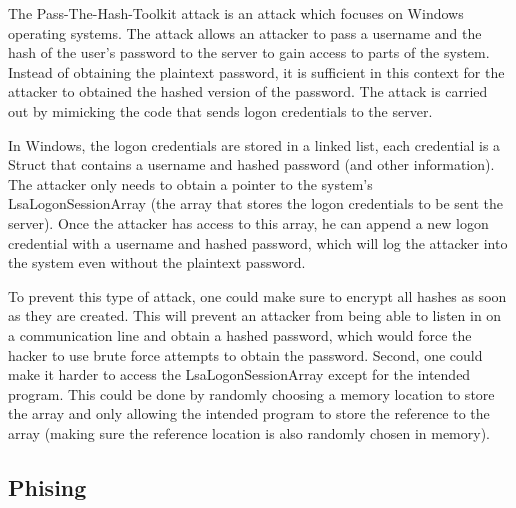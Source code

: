 \documentclass[psamsfonts]{amsart}
\begin{document}
The Pass-The-Hash-Toolkit attack is an attack which focuses on Windows operating systems. The attack allows an attacker to pass a username and the hash of the user's password to the server to gain access to parts of the system. Instead of obtaining the plaintext password, it is sufficient in this context for the attacker to obtained the hashed version of the password. The attack is carried out by mimicking the code that sends logon credentials to the server.

In Windows, the logon credentials are stored in a linked list, each credential is a Struct that contains a username and hashed password (and other information). The attacker only needs to obtain a pointer to the system's LsaLogonSessionArray (the array that stores the logon credentials to be sent the server). Once the attacker has access to this array, he can append a new logon credential with a username and hashed password, which will log the attacker into the system even without the plaintext password.

To prevent this type of attack, one could make sure to encrypt all hashes as soon as they are created. This will prevent an attacker from being able to listen in on a communication line and obtain a hashed password, which would force the hacker to use brute force attempts to obtain the password. Second, one could make it harder to access the LsaLogonSessionArray except for the intended program. This could be done by randomly choosing a memory location to store the array and only allowing the intended program to store the reference to the array (making sure the reference location is also randomly chosen in memory).

\subsection{Phising}
\end{document}
